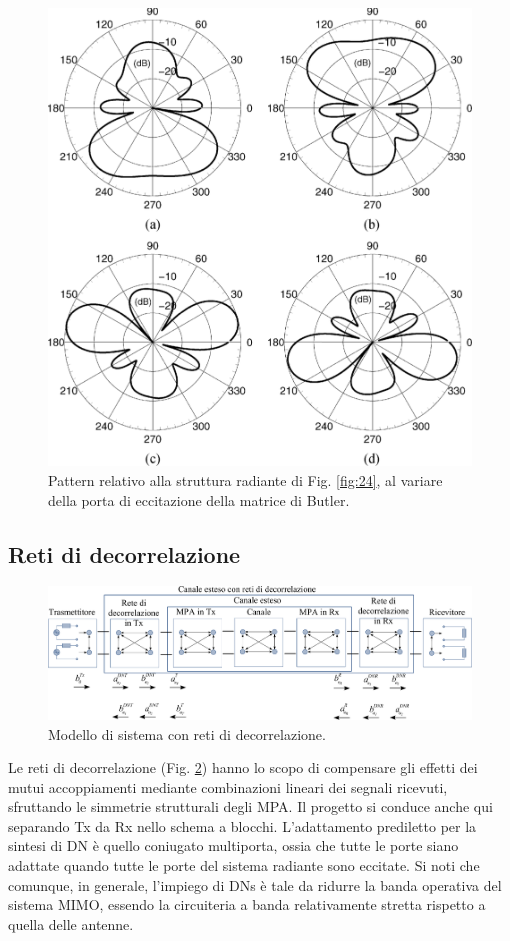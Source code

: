 \documentclass[technote]{IEEEtran}
\begin{document}
\begin{figure}[!h]
\centering
\includegraphics[width=.9\columnwidth]{figure25}
\caption{Pattern relativo alla struttura radiante di Fig. \ref{fig:24}, al variare della porta di eccitazione della matrice di Butler.}
\label{fig:25}
\end{figure}

\subsection{Reti di decorrelazione}

\begin{figure}[!h]
\centering
\includegraphics[width=\columnwidth]{figure26}
\caption{Modello di sistema con reti di decorrelazione.}
\label{fig:26}
\end{figure}


\par Le reti di decorrelazione (Fig. \ref{fig:26}) hanno lo scopo di compensare gli effetti dei mutui accoppiamenti mediante combinazioni lineari dei segnali ricevuti, sfruttando le simmetrie strutturali degli MPA. Il progetto si conduce anche qui separando Tx da Rx nello schema a blocchi. L'adattamento prediletto per la sintesi di DN è quello coniugato multiporta, ossia che tutte le porte siano adattate quando tutte le porte del sistema radiante sono eccitate. Si noti che comunque, in generale, l'impiego di DNs è tale da ridurre la banda operativa del sistema MIMO, essendo la circuiteria a banda relativamente stretta rispetto a quella delle antenne.
\end{document}
